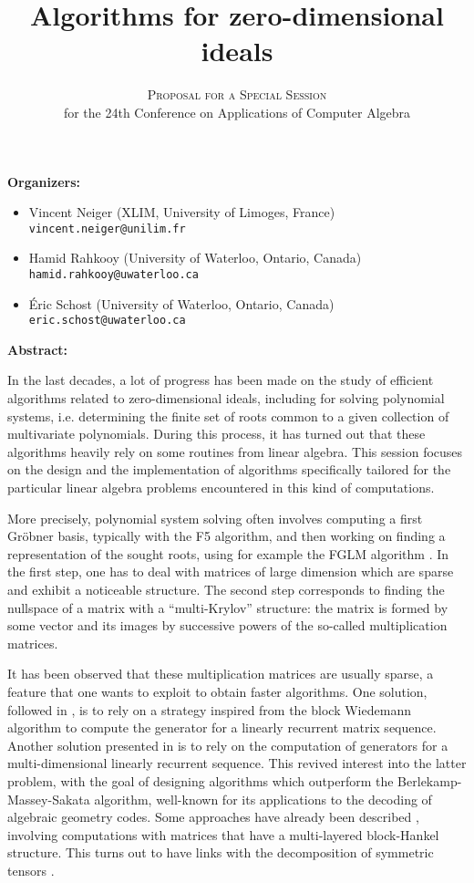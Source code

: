\documentclass[12pt,english]{article}
\title{Algorithms for zero-dimensional ideals}
\author{\textsc{Proposal for a Special Session} \\
  for the 24th Conference on Applications of Computer Algebra}
\date{}
\begin{document}
\maketitle

\textbf{Organizers:}
\begin{itemize}
  \item Vincent Neiger (XLIM, University of Limoges, France) \\
    {\small \verb+vincent.neiger@unilim.fr+}
  \item Hamid Rahkooy (University of Waterloo, Ontario, Canada) \\
    {\small \verb+hamid.rahkooy@uwaterloo.ca+}
  \item \'Eric Schost (University of Waterloo, Ontario, Canada) \\
    {\small \texttt{eric.schost@uwaterloo.ca}}
\end{itemize}

\textbf{Abstract:}

In the last decades, a lot of progress has been made on the study of efficient
algorithms related to zero-dimensional ideals, including for solving polynomial
systems, i.e. determining the finite set of roots common to a given collection
of multivariate polynomials.  During this process, it has turned out that these
algorithms heavily rely on some routines from linear algebra.  This
session focuses on the design and the implementation of algorithms specifically
tailored for the particular linear algebra problems encountered in this kind of
computations.

More precisely, polynomial system solving often involves computing a first
Gr\"obner basis, typically with the F5 algorithm, and then working on finding a
representation of the sought roots, using for example the FGLM algorithm
\cite{FaGiLaMo93}.  In the first step, one has to deal with matrices of large
dimension which are sparse and exhibit a noticeable structure.  The second step
corresponds to finding the nullspace of a matrix with a ``multi-Krylov''
structure: the matrix is formed by some vector and its images by successive
powers of the so-called multiplication matrices.

It has been observed that these multiplication matrices are usually sparse, a
feature that one wants to exploit to obtain faster algorithms.  One solution,
followed in \cite{Steel15}, is to rely on a strategy inspired from the block
Wiedemann algorithm \cite{Coppersmith94,Villard97a} to compute the generator
for a linearly recurrent matrix sequence.  Another solution presented in
\cite{FaMo17} is to rely on the computation of generators for a
multi-dimensional linearly recurrent sequence.  This revived interest into the
latter problem, with the goal of designing algorithms which outperform the
Berlekamp-Massey-Sakata algorithm, well-known for its applications to the
decoding of algebraic geometry codes.  Some approaches have already been
described \cite{BerBoyFau17,Mourrain17}, involving computations with matrices
that have a multi-layered block-Hankel structure.  This turns out to have links
with the decomposition of symmetric tensors \cite{BrCoMots10}.
\end{document}
